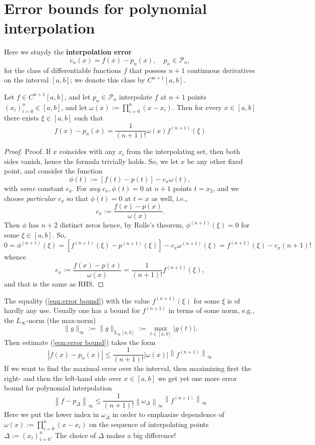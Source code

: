 \documentclass[a4paper]{article}
\begin{document}
\section{Error bounds for polynomial interpolation}
Here we stuydy the \textbf{interpolation error}
\[
    e_n(x) = f(x) - p_n(x),\quad p_n\in \mathcal{P}_n,
\]
for the class of differentiable functions $f$ that possess $n+1$ continuous derivatives on the interval $[a,b]$; we denote this class by $C^{n+1}[a,b]$. 
\begin{theorem}
    Let $f \in C^{n+1}[a, b]$, and let $p_n \in \mathcal{P}_n$ interpolate $f$ at $n+1$ points $\left(x_i\right)_{i=0}^n \in[a, b]$, and let $\omega(x):=\prod_{i=0}^n\left(x-x_i\right)$. Then for every $x \in[a, b]$ there exists $\xi \in[a, b]$ such that
    \begin{equation}\label{eqn:error bound}
        f(x)-p_n(x)=\frac{1}{(n+1) !} \omega(x) f^{(n+1)}(\xi)
    \end{equation}
\end{theorem} 
\begin{proof}
    Proof. If $x$ coincides with any $x_i$ from the interpolating set, then both sides vanish, hence the formula trivially holds. So, we let $x$ be any other fixed point, and consider the function
    \[
    \phi(t):=[f(t)-p(t)]-c_x \omega(t),
    \]
    with \textit{some} constant $c_x$. For \textit{any} $c_x, \phi(t)=0$ at $n+1$ points $t=x_2$, and we choose \textit{particular} $c_x$ so that $\phi(t)=0$ at $t=x$ as well, i.e.,
    \[
    c_x:=\frac{f(x)-p(x)}{\omega(x)} .
    \]
    Then $\phi$ has $n+2$ distinct zeros hence, by Rolle's theorem, $\phi^{(n+1)}(\xi)=0$ for some $\xi \in[a, b]$. So,
    \[
    0=\phi^{(n+1)}(\xi)=\left[f^{(n+1)}(\xi)-p^{(n+1)}(\xi)\right]-c_x \omega^{(n+1)}(\xi)=f^{(n+1)}(\xi)-c_x(n+1) !
    \]
    whence
    \[
    c_x:=\frac{f(x)-p(x)}{\omega(x)}=\frac{1}{(n+1) !} f^{(n+1)}(\xi),
    \]
    and that is the same as RHS.
\end{proof}

The equality (\ref{eqn:error bound}) with the value $f^{(n+1)}(\xi)$ for some $\xi$ is of hardly any use. Usually one has a bound for $f^{(n+1)}$ in terms of some norm, e.g., the $L_{\infty}$-norm (the max-norm)
\[
\|g\|_{\infty}:=\|g\|_{L_{\infty}[a, b]}:=\max _{t \in[a, b]}|g(t)| .
\]
Then estimate (\ref{eqn:error bound}) takes the form
\begin{equation}\label{eqn:2.2}
    \left|f(x)-p_n(x)\right| \leq \frac{1}{(n+1) !}|\omega(x)|\left\|f^{(n+1)}\right\|_{\infty}
\end{equation}
If we want to find the maximal error over the interval, then maximizing first the right- and then the left-hand side over $x \in[a, b]$ we get yet one more error bound for polynomial interpolation
\begin{equation}\label{eqn:2.3}
    \left\|f-p_{\Delta}\right\|_{\infty} \leq \frac{1}{(n+1) !}\left\|\omega_{\Delta}\right\|_{\infty}\left\|f^{(n+1)}\right\|_{\infty}
\end{equation}
Here we put the lower index in $\omega_{\Delta}$ in order to emphasize dependence of $\omega(x):=\prod_{i=0}^n\left(x-x_i\right)$ on the sequence of interpolating points $\Delta:=\left(x_i\right)_{i=0}^n$. The choice of $\Delta$ makes a big difference!
\end{document}
